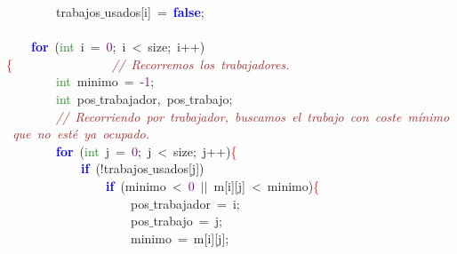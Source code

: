 \mbox{}\ \ \ \ \ \ \ \ trabajos$\_$usados\textcolor{BrickRed}{[}i\textcolor{BrickRed}{]}\ \textcolor{BrickRed}{=}\ \textbf{\textcolor{Blue}{false}}\textcolor{BrickRed}{;}\  \\
\mbox{}\ \ \ \  \\
\mbox{}\ \ \ \ \textbf{\textcolor{Blue}{for}}\ \textcolor{BrickRed}{(}\textcolor{ForestGreen}{int}\ i\ \textcolor{BrickRed}{=}\ \textcolor{Purple}{0}\textcolor{BrickRed}{;}\ i\ \textcolor{BrickRed}{\textless{}}\ size\textcolor{BrickRed}{;}\ i\textcolor{BrickRed}{++)}\textcolor{Red}{\{}\ \ \ \ \ \ \ \ \ \ \ \ \ \ \ \ \textit{\textcolor{Brown}{//\ Recorremos\ los\ trabajadores.\ }} \\
\mbox{}\ \ \ \ \ \ \ \ \textcolor{ForestGreen}{int}\ minimo\ \textcolor{BrickRed}{=}\ \textcolor{BrickRed}{-}\textcolor{Purple}{1}\textcolor{BrickRed}{;} \\
\mbox{}\ \ \ \ \ \ \ \ \textcolor{ForestGreen}{int}\ pos$\_$trabajador\textcolor{BrickRed}{,}\ pos$\_$trabajo\textcolor{BrickRed}{;}\  \\
\mbox{}\ \ \ \ \ \ \ \ \textit{\textcolor{Brown}{//\ Recorriendo\ por\ trabajador,\ buscamos\ el\ trabajo\ con\ coste\ mínimo\ que\ no\ esté\ ya\ ocupado.}} \\
\mbox{}\ \ \ \ \ \ \ \ \textbf{\textcolor{Blue}{for}}\ \textcolor{BrickRed}{(}\textcolor{ForestGreen}{int}\ j\ \textcolor{BrickRed}{=}\ \textcolor{Purple}{0}\textcolor{BrickRed}{;}\ j\ \textcolor{BrickRed}{\textless{}}\ size\textcolor{BrickRed}{;}\ j\textcolor{BrickRed}{++)}\textcolor{Red}{\{} \\
\mbox{}\ \ \ \ \ \ \ \ \ \ \ \ \textbf{\textcolor{Blue}{if}}\ \textcolor{BrickRed}{(!}trabajos$\_$usados\textcolor{BrickRed}{[}j\textcolor{BrickRed}{])}\  \\
\mbox{}\ \ \ \ \ \ \ \ \ \ \ \ \ \ \ \ \textbf{\textcolor{Blue}{if}}\ \textcolor{BrickRed}{(}minimo\ \textcolor{BrickRed}{\textless{}}\ \textcolor{Purple}{0}\ \textcolor{BrickRed}{$|$$|$}\ m\textcolor{BrickRed}{[}i\textcolor{BrickRed}{][}j\textcolor{BrickRed}{]}\ \textcolor{BrickRed}{\textless{}}\ minimo\textcolor{BrickRed}{)}\textcolor{Red}{\{} \\
\mbox{}\ \ \ \ \ \ \ \ \ \ \ \ \ \ \ \ \ \ \ \ pos$\_$trabajador\ \textcolor{BrickRed}{=}\ i\textcolor{BrickRed}{;} \\
\mbox{}\ \ \ \ \ \ \ \ \ \ \ \ \ \ \ \ \ \ \ \ pos$\_$trabajo\ \textcolor{BrickRed}{=}\ j\textcolor{BrickRed}{;}\  \\
\mbox{}\ \ \ \ \ \ \ \ \ \ \ \ \ \ \ \ \ \ \ \ minimo\ \textcolor{BrickRed}{=}\ m\textcolor{BrickRed}{[}i\textcolor{BrickRed}{][}j\textcolor{BrickRed}{];}\  \\
